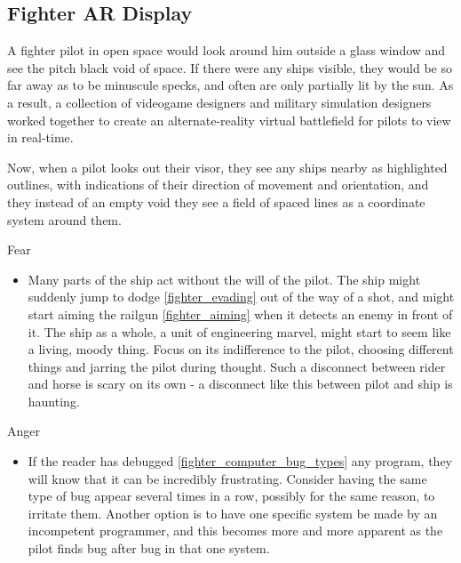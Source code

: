 \documentclass[a4paper]{article}
\begin{document}
\newpage
\subsection{Fighter AR Display} \label{fighter}

A fighter pilot in open space would look around him outside a glass window and see the pitch black void of space. If there were any ships visible, they would be so far away as to be minuscule specks, and often are only partially lit by the sun. As a result, a collection of videogame designers and military simulation designers worked together to create an alternate-reality virtual battlefield for pilots to view in real-time.

Now, when a pilot looks out their visor, they see any ships nearby as highlighted outlines, with indications of their direction of movement and orientation, and they instead of an empty void they see a field of spaced lines as a coordinate system around them.

\vspace{0.3cm}
\begin{minipage}[t]{0.4\linewidth}
Fear
\begin{itemize}
\item Many parts of the ship act without the will of the pilot. The ship might suddenly jump to dodge \ref{fighter_evading} out of the way of a shot, and might start aiming the railgun \ref{fighter_aiming} when it detects an enemy in front of it. The ship as a whole, a unit of engineering marvel, might start to seem like a living, moody thing. Focus on its indifference to the pilot, choosing different things and jarring the pilot during thought. Such a disconnect between rider and horse is scary on its own - a disconnect like this between pilot and ship is haunting.
\end{itemize}
\end{minipage} 
\begin{minipage}[t]{0.4\linewidth}
Anger
\begin{itemize}
\item If the reader has debugged \ref{fighter_computer_bug_types} any program, they will know that it can be incredibly frustrating. Consider having the same type of bug appear several times in a row, possibly for the same reason, to irritate them. Another option is to have one specific system be made by an incompetent programmer, and this becomes more and more apparent as the pilot finds bug after bug in that one system.
\end{itemize}
\end{minipage}
\end{document}
